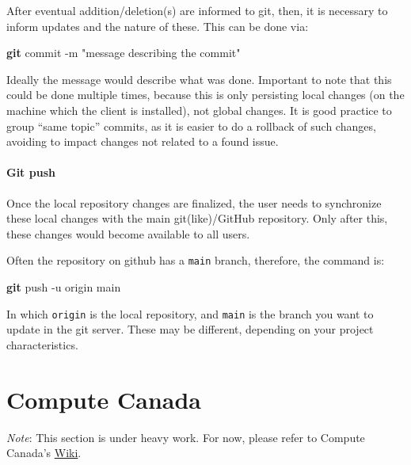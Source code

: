 \documentclass[
]{book}
\newenvironment{Shaded}{\begin{snugshade}}{\end{snugshade}}
\newcommand{\AttributeTok}[1]{\textcolor[rgb]{0.13,0.29,0.53}{#1}}
\newcommand{\FunctionTok}[1]{\textcolor[rgb]{0.13,0.29,0.53}{\textbf{#1}}}
\newcommand{\NormalTok}[1]{#1}
\newcommand{\StringTok}[1]{\textcolor[rgb]{0.31,0.60,0.02}{#1}}
\begin{document}
After eventual addition/deletion(s) are informed to git, then, it is necessary
to inform updates and the nature of these. This can be done via:

\begin{Shaded}
\begin{Highlighting}[]
\FunctionTok{git}\NormalTok{ commit }\AttributeTok{{-}m} \StringTok{"message describing the commit"}
\end{Highlighting}
\end{Shaded}

Ideally the message would describe what was done. Important to note that this
could be done multiple times, because this is only persisting local changes (on
the machine which the client is installed), not global changes. It is good practice
to group ``same topic'' commits, as it is easier to do a rollback of such changes,
avoiding to impact changes not related to a found issue.

\hypertarget{git-push}{%
\subsubsection{Git push}\label{git-push}}

Once the local repository changes are finalized, the user needs to synchronize
these local changes with the main git(like)/GitHub repository. Only after this,
these changes would become available to all users.

Often the repository on github has a \texttt{main} branch, therefore, the command is:

\begin{Shaded}
\begin{Highlighting}[]
\FunctionTok{git}\NormalTok{ push }\AttributeTok{{-}u}\NormalTok{ origin main}
\end{Highlighting}
\end{Shaded}

In which \texttt{origin} is the local repository, and \texttt{main} is the branch you want to
update in the git server. These may be different, depending on your project
characteristics.

\hypertarget{compute-canada}{%
\chapter{Compute Canada}\label{compute-canada}}

\emph{Note}: This section is under heavy work. For now, please refer to Compute
Canada's \href{https://docs.computecanada.ca/wiki/Compute_Canada_Documentation}{Wiki}.
\end{document}
